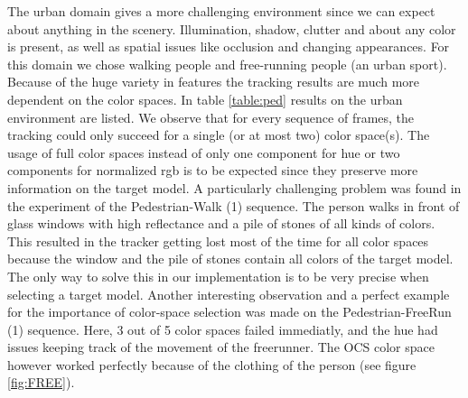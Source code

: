 \documentclass[a4paper,11pt]{article}
\begin{document}
		The urban domain gives a more challenging environment since we can expect about anything in the
		scenery. Illumination, shadow, clutter and about any color is present, as well as spatial issues like occlusion and changing appearances. For this domain we chose walking people and free-running people (an urban sport). Because of the huge variety in features the tracking results are much more dependent on the color spaces. In table \ref{table:ped} results on the urban environment are listed. We observe that for every sequence of frames, the tracking could only succeed for a single (or at most two) color space(s). The usage of full color spaces instead of only one component for hue or two components for normalized rgb is to be expected since they preserve more information on the target model. A particularly challenging problem was found in the experiment of the Pedestrian-Walk (1) sequence. The person walks in front of glass windows with high reflectance and a pile of stones of all kinds of colors. This resulted in the tracker getting lost most of the time for all color spaces because the window and the pile of stones contain all colors of the target model. The only way to solve this in our implementation is to be very precise when selecting a target model. Another interesting observation and a perfect example for the importance of color-space selection was made on the Pedestrian-FreeRun (1) sequence. Here, 3 out of 5 color spaces failed immediatly, and the hue had issues keeping track of the movement of the freerunner. The OCS color space however worked perfectly because of the clothing of the person (see figure \ref{fig:FREE}). 
\end{document}
